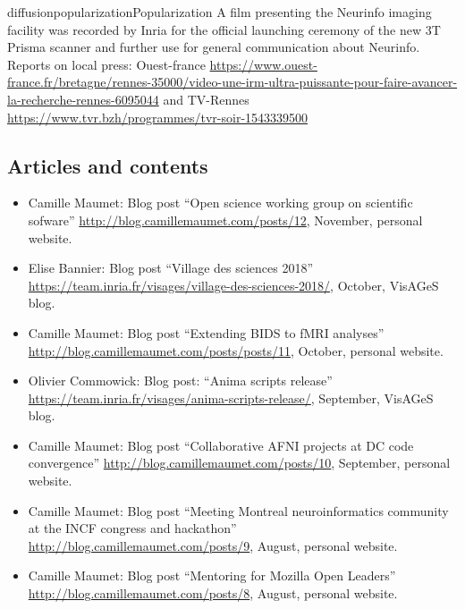 \documentclass{ra2018}
\begin{document}
\begin{module}{diffusion}{popularization}{Popularization}
A film presenting the Neurinfo imaging facility was recorded by Inria for the official launching ceremony of the new 3T Prisma scanner and further use for general communication about Neurinfo. Reports on local press: Ouest-france \url{https://www.ouest-france.fr/bretagne/rennes-35000/video-une-irm-ultra-puissante-pour-faire-avancer-la-recherche-rennes-6095044} and TV-Rennes \url{https://www.tvr.bzh/programmes/tvr-soir-1543339500}

\subsection{Articles and contents}
\begin{itemize}
   \item Camille Maumet: Blog post ``Open science working group on scientific sofware'' \url{http://blog.camillemaumet.com/posts/12}, November, personal website. 
   \item Elise Bannier: Blog post ``Village des sciences 2018'' \url{https://team.inria.fr/visages/village-des-sciences-2018/}, October, VisAGeS blog.  
   \item Camille Maumet: Blog post ``Extending BIDS to fMRI analyses'' \url{http://blog.camillemaumet.com/posts/posts/11}, October, personal website. 
   \item Olivier Commowick: Blog post: ``Anima scripts release'' \url{https://team.inria.fr/visages/anima-scripts-release/}, September, VisAGeS blog.
   \item Camille Maumet: Blog post ``Collaborative AFNI projects at DC code convergence'' \url{http://blog.camillemaumet.com/posts/10}, September, personal website. 
   \item Camille Maumet: Blog post ``Meeting Montreal neuroinformatics community at the INCF congress and hackathon'' \url{http://blog.camillemaumet.com/posts/9}, August, personal website. 
   \item Camille Maumet: Blog post ``Mentoring for Mozilla Open Leaders'' \url{http://blog.camillemaumet.com/posts/8}, August, personal website. 

\end{itemize}
\end{module}
\end{document}
